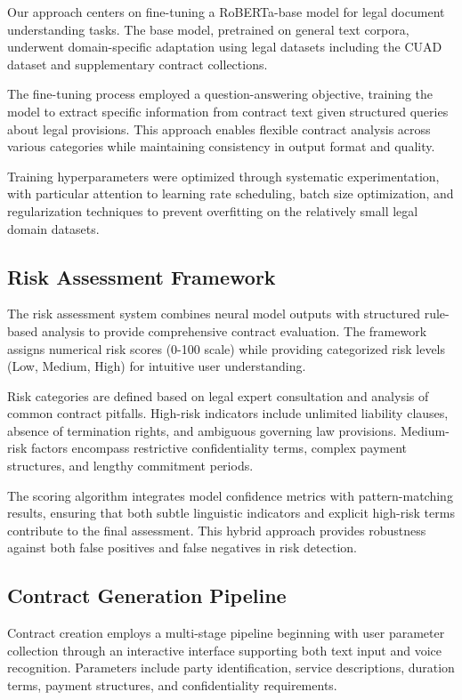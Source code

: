 \documentclass[conference]{IEEEtran}
\begin{document}
Our approach centers on fine-tuning a RoBERTa-base model for legal document understanding tasks. The base model, pretrained on general text corpora, underwent domain-specific adaptation using legal datasets including the CUAD dataset and supplementary contract collections.

The fine-tuning process employed a question-answering objective, training the model to extract specific information from contract text given structured queries about legal provisions. This approach enables flexible contract analysis across various categories while maintaining consistency in output format and quality.

Training hyperparameters were optimized through systematic experimentation, with particular attention to learning rate scheduling, batch size optimization, and regularization techniques to prevent overfitting on the relatively small legal domain datasets.

\subsection{Risk Assessment Framework}

The risk assessment system combines neural model outputs with structured rule-based analysis to provide comprehensive contract evaluation. The framework assigns numerical risk scores (0-100 scale) while providing categorized risk levels (Low, Medium, High) for intuitive user understanding.

Risk categories are defined based on legal expert consultation and analysis of common contract pitfalls. High-risk indicators include unlimited liability clauses, absence of termination rights, and ambiguous governing law provisions. Medium-risk factors encompass restrictive confidentiality terms, complex payment structures, and lengthy commitment periods.

The scoring algorithm integrates model confidence metrics with pattern-matching results, ensuring that both subtle linguistic indicators and explicit high-risk terms contribute to the final assessment. This hybrid approach provides robustness against both false positives and false negatives in risk detection.

\subsection{Contract Generation Pipeline}

Contract creation employs a multi-stage pipeline beginning with user parameter collection through an interactive interface supporting both text input and voice recognition. Parameters include party identification, service descriptions, duration terms, payment structures, and confidentiality requirements.
\end{document}
